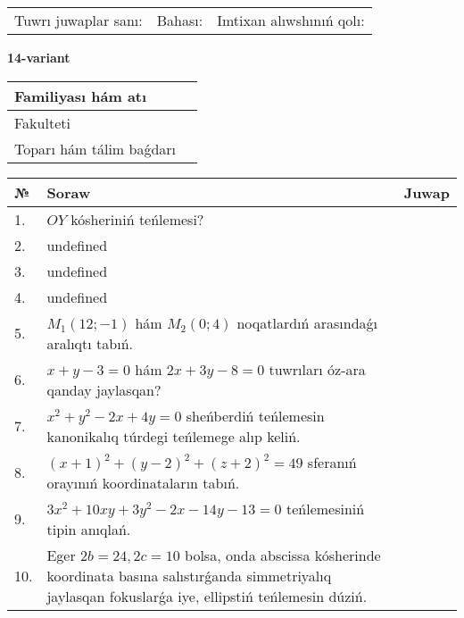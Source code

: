 \documentclass{article}
\begin{document}
\vspace{0.7cm}

\begin{tabular}{lll}
Tuwrı juwaplar sanı: \underline{\hspace{1cm}} & 
Bahası: \underline{\hspace{1cm}} & 
Imtixan alıwshınıń qolı: \underline{\hspace{2cm}} \\
\end{tabular}

\egroup

\newpage


\textbf{14-variant}\\

\bgroup
\def\arraystretch{1.6} %

\begin{tabular}{|m{5.7cm}|m{9.5cm}|}
\hline
Familiyası hám atı & \\
\hline
Fakulteti  & \\
\hline
Toparı hám tálim baǵdarı  & \\
\hline
\end{tabular}

\vspace{0.7cm}

\begin{tabular}{|m{0.7cm}|m{10cm}|m{4cm}|}
\hline
№ & Soraw & Juwap \\
\hline
1. & \(OY\) kósheriniń teńlemesi? &  \\
\hline
2. & undefined &  \\
\hline
3. & undefined &  \\
\hline
4. & undefined &  \\
\hline
5. & \(M_{1} (12; - 1)\) hám \(M_{2} (0;4)\) noqatlardıń arasındaǵı aralıqtı tabıń. &  \\
\hline
6. & \(x + y - 3 = 0\) hám \(2 x + 3 y - 8 = 0\) tuwrıları óz-ara qanday jaylasqan? &  \\
\hline
7. & \(x^{2} + y^{2} - 2 x + 4 y = 0\) sheńberdiń teńlemesin kanonikalıq túrdegi teńlemege alıp keliń. &  \\
\hline
8. & \((x + 1) ^{2} + (y - 2) ^{2} + (z + 2) ^{2} = 49\) sferanıń orayınıń koordinataların tabıń. &  \\
\hline
9. & \(3 x^{2} + 10 xy + 3 y^{2} - 2 x - 14 y - 13 = 0\) teńlemesiniń tipin anıqlań. &  \\
\hline
10. & Eger \(2 b = 24, 2 c = 10\) bolsa, onda abscissa kósherinde koordinata basına salıstırǵanda simmetriyalıq jaylasqan fokuslarǵa iye, ellipstiń teńlemesin dúziń. & \\
\hline
\end{tabular}
\end{document}
